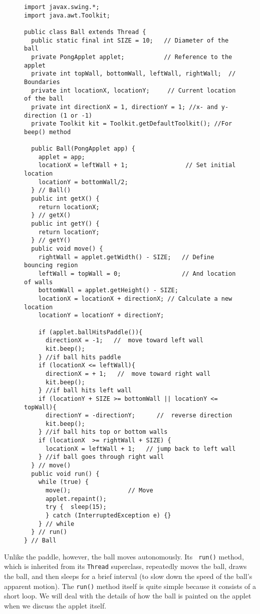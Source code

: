\begin{figure}[p]
\jjjprogstart
\begin{jjjlisting}[34.5pc]
\begin{lstlisting}
import javax.swing.*;
import java.awt.Toolkit;

public class Ball extends Thread {
  public static final int SIZE = 10;   // Diameter of the ball
  private PongApplet applet;           // Reference to the applet
  private int topWall, bottomWall, leftWall, rightWall;  // Boundaries
  private int locationX, locationY;     // Current location of the ball
  private int directionX = 1, directionY = 1; //x- and y-direction (1 or -1)
  private Toolkit kit = Toolkit.getDefaultToolkit(); //For beep() method

  public Ball(PongApplet app) {
    applet = app;
    locationX = leftWall + 1;                // Set initial location
    locationY = bottomWall/2;
  } // Ball()
  public int getX() {
    return locationX;
  } // getX()
  public int getY() {
    return locationY;
  } // getY()
  public void move() {
    rightWall = applet.getWidth() - SIZE;   // Define bouncing region
    leftWall = topWall = 0;                 // And location of walls
    bottomWall = applet.getHeight() - SIZE;
    locationX = locationX + directionX; // Calculate a new location
    locationY = locationY + directionY;

    if (applet.ballHitsPaddle()){
      directionX = -1;   //  move toward left wall
      kit.beep();
    } //if ball hits paddle
    if (locationX <= leftWall){
      directionX = + 1;   //  move toward right wall
      kit.beep();
    } //if ball hits left wall
    if (locationY + SIZE >= bottomWall || locationY <= topWall){
      directionY = -directionY;      //  reverse direction
      kit.beep();
    } //if ball hits top or bottom walls
    if (locationX  >= rightWall + SIZE) {
      locationX = leftWall + 1;   // jump back to left wall
    } //if ball goes through right wall
  } // move()
  public void run() {
    while (true) {
      move();                // Move
      applet.repaint();
      try {  sleep(15);
      } catch (InterruptedException e) {}
    } // while
  } // run()
} // Ball
\end{lstlisting}
\end{jjjlisting}
\end{figure}

Unlike the paddle, however, the ball moves autonomously.  Its {\tt
run()} method, which is inherited from its {\tt Thread} superclass,
repeatedly moves the ball, draws the ball, and then sleeps for a brief
interval (to slow down the speed of the ball's apparent motion).  The
{\tt run()} method itself is quite simple because it consists of a
short loop.  We will deal with the details of how the ball is painted
on the applet when we discuss the applet itself.

